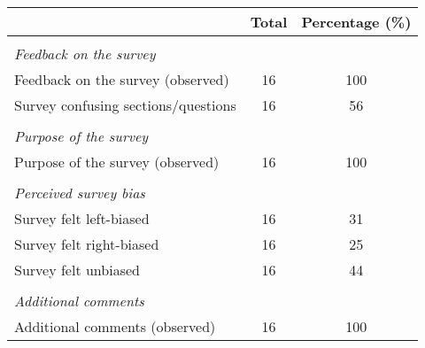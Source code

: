 \begin{tabular}{l*{1}{cc}}
\toprule
                &    Total&Percentage (\%)\\
\midrule
\vspace{0.1em} \\ \emph{Feedback on the survey}&         &         \\
Feedback on the survey (observed)&       16&      100\\
Survey confusing sections/questions&       16&       56\\
\vspace{0.1em} \\ \emph{Purpose of the survey}&         &         \\
Purpose of the survey (observed)&       16&      100\\
\vspace{0.1em} \\ \emph{Perceived survey bias}&         &         \\
Survey felt left-biased&       16&       31\\
Survey felt right-biased&       16&       25\\
Survey felt unbiased&       16&       44\\
\vspace{0.1em} \\ \emph{Additional comments}&         &         \\
Additional comments (observed)&       16&      100\\
\bottomrule
\end{tabular}
